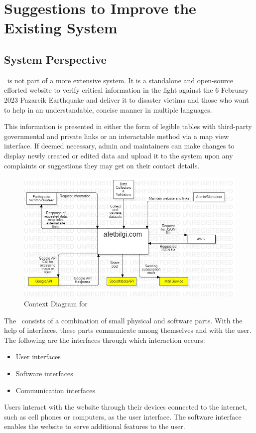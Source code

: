 \section{Suggestions to Improve the Existing System}

\subsection{System Perspective}

\afetbilgi\ is not part of a more extensive system. It is a standalone and open-source efforted website to verify critical information in the fight against the 6 February 2023 Pazarcik Earthquake and deliver it to disaster victims and those who want to help in an understandable, concise manner in multiple languages.

This information is presented in either the form of legible tables with third-party governmental and private links or an interactable method via a map view interface. If deemed necessary, admin and maintainers can make changes to display newly created or edited data and upload it to the system upon any complaints or suggestions they may get on their contact details.

\begin{figure}[H]
  \centering
  \includegraphics[width=\linewidth]{img/context-diagram-s4.jpg}
  \caption{Context Diagram for \afetbilgi}
\end{figure}

\vfill
\newpage

The \afetbilgi\ consists of a combination of small physical and software parts. With the help of interfaces, these parts communicate among themselves and with the user. The following are the interfaces through which interaction occurs:
\begin{itemize}
  \setlength{\itemsep}{1pt}
  \item User interfaces
  \item Software interfaces
  \item Communication interfaces
\end{itemize}
Users interact with the website through their devices connected to the internet, such as cell phones or computers, as the user interface. The software interface enables the website to serve additional features to the user.


